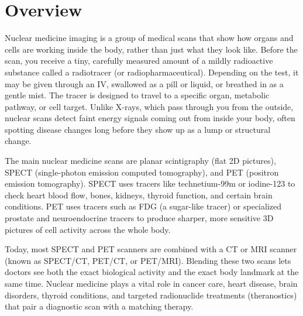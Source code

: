 \label{ch:infographic-nuclear-imaging-overview}

\section{Overview}

Nuclear medicine imaging is a group of medical scans that show how organs and cells are working inside the body, rather than just what they look like. Before the scan, you receive a tiny, carefully measured amount of a mildly radioactive substance called a radiotracer (or radiopharmaceutical). Depending on the test, it may be given through an IV, swallowed as a pill or liquid, or breathed in as a gentle mist. The tracer is designed to travel to a specific organ, metabolic pathway, or cell target. Unlike X-rays, which pass through you from the outside, nuclear scans detect faint energy signals coming out from inside your body, often spotting disease changes long before they show up as a lump or structural change.

The main nuclear medicine scans are planar scintigraphy (flat 2D pictures), SPECT (single-photon emission computed tomography), and PET (positron emission tomography). SPECT uses tracers like technetium-99m or iodine-123 to check heart blood flow, bones, kidneys, thyroid function, and certain brain conditions. PET uses tracers such as FDG (a sugar-like tracer) or specialized prostate and neuroendocrine tracers to produce sharper, more sensitive 3D pictures of cell activity across the whole body.

Today, most SPECT and PET scanners are combined with a CT or MRI scanner (known as SPECT/CT, PET/CT, or PET/MRI). Blending these two scans lets doctors see both the exact biological activity and the exact body landmark at the same time. Nuclear medicine plays a vital role in cancer care, heart disease, brain disorders, thyroid conditions, and targeted radionuclide treatments (theranostics) that pair a diagnostic scan with a matching therapy.

